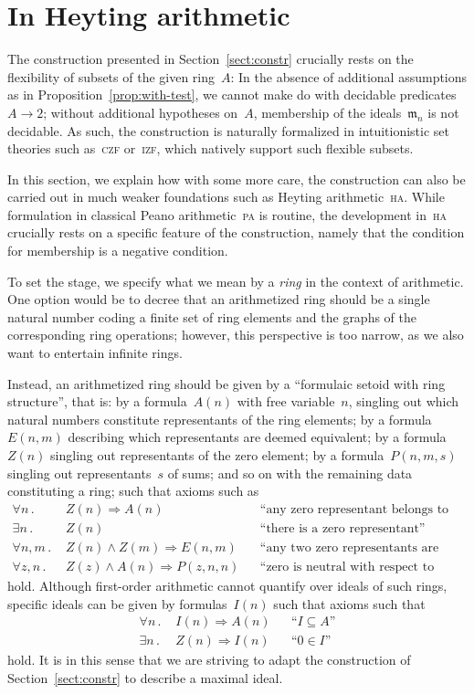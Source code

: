 \documentclass[oneside,reqno]{amsart}
\theoremstyle{definition}
\theoremstyle{plain}
\theoremstyle{remark}
\newcommand{\mmm}{\mathfrak{m}}
\renewcommand{\_}{\mathpunct{.}\,}
\begin{document}
\section{In Heyting arithmetic}
\label{sect:arithmetization}

The construction presented in Section~\ref{sect:constr} crucially rests on the
flexibility of subsets of the given ring~$A$: In the absence of additional
assumptions as in Proposition~\ref{prop:with-test},
we cannot make do with decidable
predicates~$A \to 2$; without additional hypotheses on~$A$, membership of the
ideals~$\mmm_n$ is not decidable. As such, the construction is
naturally formalized in intuitionistic set theories such as~\textsc{czf}
or~\textsc{izf}, which natively support such flexible subsets.

In this section, we explain how with some more care, the construction can also
be carried out in much weaker foundations such as Heyting
arithmetic~\textsc{ha}. While formulation in classical Peano arithmetic~\textsc{pa}
is routine, the development in~\textsc{ha} crucially rests on a specific
feature of the construction, namely that the condition for membership is a
negative condition.

To set the stage, we specify what we mean by a \emph{ring} in the context of
arithmetic. One option would be to decree that an arithmetized ring should be a single
natural number coding a finite set of ring elements and the graphs of the
corresponding ring operations; however, this perspective is too narrow, as we
also want to entertain infinite rings.

Instead, an arithmetized ring should be given by a ``formulaic setoid with ring
structure'', that is: by a formula~$A(n)$ with free
variable~$n$, singling out which natural numbers constitute
representants of the ring elements; by a formula~$E(n,m)$ describing which
representants are deemed equivalent; by a formula~$Z(n)$ singling out
representants of the zero element; by a formula~$P(n,m,s)$ singling out
representants~$s$ of sums; and so on with the remaining data constituting
a ring; such that axioms such as
\begin{align*}
  \forall n\_ & Z(n) \Rightarrow A(n) && \text{``any zero representant belongs to the ring''} \\
  \exists n\_ & Z(n) && \text{``there is a zero representant''} \\
  \forall n,m\_ & Z(n) \wedge Z(m) \Longrightarrow E(n,m) && \text{``any two zero representants are equivalent''} \\
  \forall z,n\_ & Z(z) \wedge A(n) \Longrightarrow P(z,n,n) && \text{``zero is neutral with respect to addition''}
\end{align*}
hold. Although first-order arithmetic cannot quantify over ideals of such
rings, specific ideals can be given by formulas~$I(n)$ such that axioms such that
\begin{align*}
  \forall n\_ & I(n) \Rightarrow A(n) && \text{``$I \subseteq A$''} \\
  \exists n\_ & Z(n) \Rightarrow I(n) && \text{``$0 \in I$''}
\end{align*}
hold. It is in this sense that we are striving to adapt the construction of
Section~\ref{sect:constr} to describe a maximal ideal.
\end{document}
